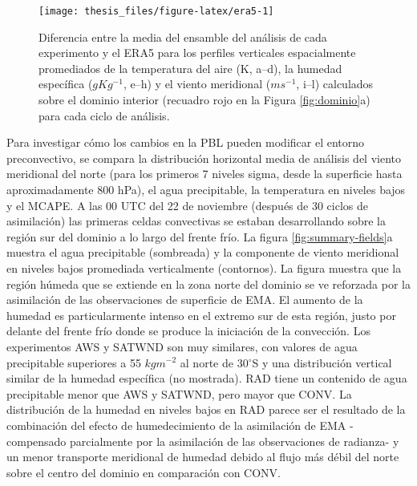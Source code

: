 \documentclass[12pt,oneside,a4paper]{reedthesis}
\begin{document}
\begin{figure}

\texttt{[image: thesis\_files/figure-latex/era5-1]} \hfill{}

\caption{Diferencia entre la media del ensamble del análisis de cada experimento y el ERA5 para los perfiles verticales espacialmente promediados de la temperatura del aire (K, a--d), la humedad específica (\(gKg^{-1}\), e--h) y el viento meridional (\(ms^{-1}\), i--l) calculados sobre el dominio interior (recuadro rojo en la Figura \ref{fig:dominio}a) para cada ciclo de análisis.}\label{fig:era5}
\end{figure}
Para investigar cómo los cambios en la PBL pueden modificar el entorno preconvectivo, se compara la distribución horizontal media de análisis del viento meridional del norte (para los primeros 7 niveles sigma, desde la superficie hasta aproximadamente 800 hPa), el agua precipitable, la temperatura en niveles bajos y el MCAPE. A las 00 UTC del 22 de noviembre (después de 30 ciclos de asimilación) las primeras celdas convectivas se estaban desarrollando sobre la región sur del dominio a lo largo del frente frío. La figura \ref{fig:summary-fields}a muestra el agua precipitable (sombreada) y la componente de viento meridional en niveles bajos promediada verticalmente (contornos). La figura muestra que la región húmeda que se extiende en la zona norte del dominio se ve reforzada por la asimilación de las observaciones de superficie de EMA. El aumento de la humedad es particularmente intenso en el extremo sur de esta región, justo por delante del frente frío donde se produce la iniciación de la convección. Los experimentos AWS y SATWND son muy similares, con valores de agua precipitable superiores a 55 \(kgm^{-2}\) al norte de 30\(^{\circ}\)S y una distribución vertical similar de la humedad específica (no mostrada). RAD tiene un contenido de agua precipitable menor que AWS y SATWND, pero mayor que CONV. La distribución de la humedad en niveles bajos en RAD parece ser el resultado de la combinación del efecto de humedecimiento de la asimilación de EMA -compensado parcialmente por la asimilación de las observaciones de radianza- y un menor transporte meridional de humedad debido al flujo más débil del norte sobre el centro del dominio en comparación con CONV.
\end{document}
